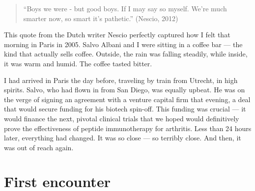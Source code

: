 \documentclass[authordate, editorial]{jote-new-article}
\author[1]{\mbox{Berent Prakken\orcid{0000-0001-8488-4816}}}
\affil[1]{UMC Utrecht, Utrecht, the Netherlands}
\begin{document}
\begin{frontmatter}
  \maketitle
  \begin{abstract}
    \printabstracttext
  \end{abstract}
\end{frontmatter}






	\begin{quote}“Boys we were - but good boys. If I may say so myself. We're much smarter now, so smart it's pathetic.” (Nescio, 2012)\end{quote}







	This quote from the Dutch writer Nescio perfectly captured how I felt that morning in Paris in 2005. Salvo Albani and I were sitting in a coffee bar — the kind that actually sells coffee. Outside, the rain was falling steadily, while inside, it was warm and humid. The coffee tasted bitter.







	I had arrived in Paris the day before, traveling by train from Utrecht, in high spirits. Salvo, who had flown in from San Diego, was equally upbeat. He was on the verge of signing an agreement with a venture capital firm that evening, a deal that would secure funding for his biotech spin-off. This funding was crucial — it would finance the next, pivotal clinical trials that we hoped would definitively prove the effectiveness of peptide immunotherapy for arthritis. Less than 24 hours later, everything had changed. It was so close — so terribly close. And then, it was out of reach again.



	\section{First encounter}
\end{document}
